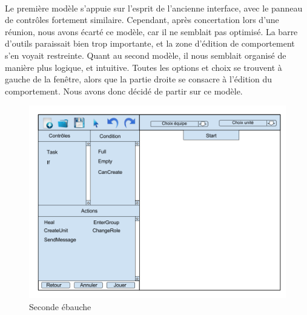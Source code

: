 \documentclass{report}
\begin{document}
\paragraph{}
Le première modèle s'appuie sur l'esprit de l'ancienne interface, avec le panneau de contrôles fortement similaire. Cependant, après concertation lors d'une réunion, nous avons écarté ce modèle, car il ne semblait pas optimisé. La barre d'outils paraissait bien trop importante, et la zone d'édition de comportement s'en voyait restreinte.\newline
\clearpage
Quant au second modèle, il nous semblait organisé de manière plus logique, et intuitive. Toutes les options et choix se trouvent à gauche de la fenêtre, alors que la partie droite se consacre à l'édition du comportement.\newline
Nous avons donc décidé de partir sur ce modèle.

\begin{figure}[!h]
	\centering
		\includegraphics[scale=0.25]{ConceptionGraphique2}
	\caption{Seconde ébauche}
\end{figure}



\end{document}
